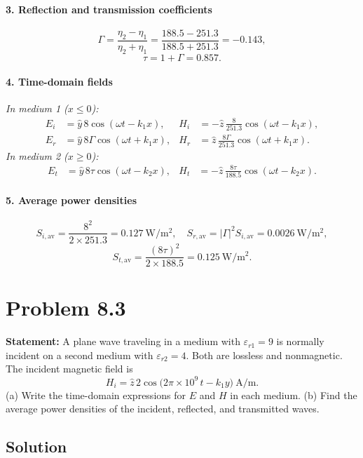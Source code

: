 \paragraph{3. Reflection and transmission coefficients}
\[
\Gamma = \frac{\eta_2 - \eta_1}{\eta_2 + \eta_1}
       = \frac{188.5 - 251.3}{188.5 + 251.3}
       = -0.143,
\]
\[
\tau = 1 + \Gamma = 0.857.
\]

\paragraph{4. Time-domain fields}
\textit{In medium 1 ($x\le0$):}
\[
\begin{aligned}
E_i &= \hat y\,8\cos(\omega t - k_1 x), &
H_i &= -\hat z\,\frac{8}{251.3}\cos(\omega t - k_1 x),\\
E_r &= \hat y\,8\Gamma\cos(\omega t + k_1 x), &
H_r &=  \hat z\,\frac{8\Gamma}{251.3}\cos(\omega t + k_1 x).
\end{aligned}
\]
\textit{In medium 2 ($x\ge0$):}
\[
\begin{aligned}
E_t &= \hat y\,8\tau\cos(\omega t - k_2 x), &
H_t &= -\hat z\,\frac{8\tau}{188.5}\cos(\omega t - k_2 x).
\end{aligned}
\]

\paragraph{5. Average power densities}
\[
S_{i,\mathrm{av}}
= \frac{8^2}{2 \times 251.3}
= 0.127\ \mathrm{W/m^2},\quad
S_{r,\mathrm{av}}
= |\Gamma|^2 S_{i,\mathrm{av}}
= 0.0026\ \mathrm{W/m^2},
\]
\[
S_{t,\mathrm{av}}
= \frac{(8\tau)^2}{2 \times 188.5}
= 0.125\ \mathrm{W/m^2}.
\]

\section*{Problem 8.3}
\textbf{Statement:} A plane wave traveling in a medium with $\varepsilon_{r1}=9$ is normally incident on a second medium with $\varepsilon_{r2}=4$. Both are lossless and nonmagnetic. The incident magnetic field is
\[
H_i = \hat z\,2\cos\bigl(2\pi \times 10^9\,t - k_1 y\bigr)\ \mathrm{A/m}.
\]
(a) Write the time-domain expressions for $E$ and $H$ in each medium. (b) Find the average power densities of the incident, reflected, and transmitted waves.

\subsection*{Solution}
